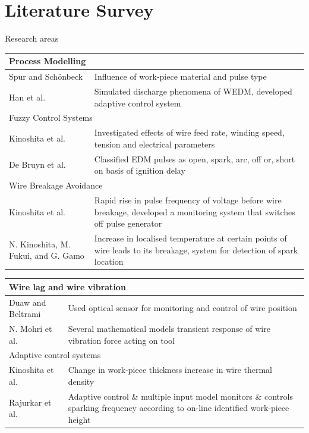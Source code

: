 \documentclass[10pt]{beamer}
\begin{document}
\section{Literature Survey}

\begin{frame}[allowframebreaks]{Research areas}
\begin{table}
  \begin{tabular}{p{3.5cm} p{7cm}}
    \hline
    \multicolumn{2}{l}{Process Modelling} \\
    \hline
    Spur and Sch{\"o}nbeck \cite{spur1993anode} & Influence of \alert{work-piece material} and \alert{pulse type}\\
    Han et al. \cite{han2002high} & Simulated \alert{discharge phenomena} of WEDM, developed adaptive control system\\
    \hline
    \multicolumn{2}{l}{Fuzzy Control Systems} \\
    \hline
    Kinoshita et al. \cite{kinoshita1976study} & Investigated effects of \alert{wire feed rate, winding speed, tension and electrical parameters}\\
    De Bruyn et al. \cite{de1982has} & Classified EDM pulses as \alert{open, spark, arc, off or, short} on basis of ignition delay\\
    \hline
    \multicolumn{2}{l}{Wire Breakage Avoidance} \\
    \hline
    Kinoshita et al. \cite{kinoshita1982control} & Rapid rise in \alert{pulse frequency} of voltage before \alert{wire breakage}, developed a monitoring system that switches off pulse generator\\
    N. Kinoshita, M. Fukui, and G. Gamo \cite{kunieda1990line} & Increase in \alert{localised temperature} at certain points of wire leads to its breakage, system for \alert{detection of spark location}
  \end{tabular}
\end{table}
\begin{table}
  \begin{tabular}{p{3.5cm} p{7cm}}
    \hline
    \multicolumn{2}{l}{Wire lag and wire vibration} \\
    \hline
    Duaw and Beltrami \cite{dauw1994high} & Used \alert{optical sensor} for monitoring and control of wire position \\
    N. Mohri et al. \cite{mohri1998system} & Several mathematical models \textendash{} transient response of \alert{wire vibration} \textendash{} force acting on tool\\
    \hline
    \multicolumn{2}{l}{Adaptive control systems} \\
    \hline
    Kinoshita et al. \cite{kinoshita1982control} & Change in \alert{work-piece thickness} \textendash{} increase in wire thermal density\\
    Rajurkar et al. \cite{rajurkar1997wedm} & Adaptive control \& multiple input model \textendash{} monitors \& controls \alert{sparking frequency} according to on-line identified \alert{work-piece height}\\
    \hline
  \end{tabular}
\end{table}
\end{frame}
\end{document}
